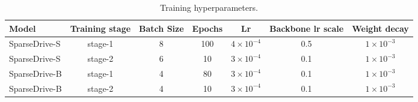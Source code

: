 \begin{table}[htbp]
\centering
\caption{Training hyperparameters.}
\label{tab:training_details}
\vspace{5pt}
\scalebox{0.8}
{
\begin{tabular}{l|cccccc}
\toprule
Model &  Training stage & Batch Size & Epochs & Lr & Backbone lr scale & Weight decay \\
\midrule
SparseDrive-S & stage-1 & 8 & 100 & $4\times10^{-4}$ & 0.5 & $1\times10^{-3}$ \\
SparseDrive-S & stage-2 & 6 & 10 & $3\times10^{-4}$ & 0.1 & $1\times10^{-3}$ \\
\midrule
SparseDrive-B & stage-1 & 4 & 80 & $3\times10^{-4}$ & 0.1 & $1\times10^{-3}$ \\
SparseDrive-B & stage-2 & 4 & 10 & $3\times10^{-4}$ & 0.1 & $1\times10^{-3}$ \\
\bottomrule
\end{tabular}
}
\vspace{5pt}
\end{table} 